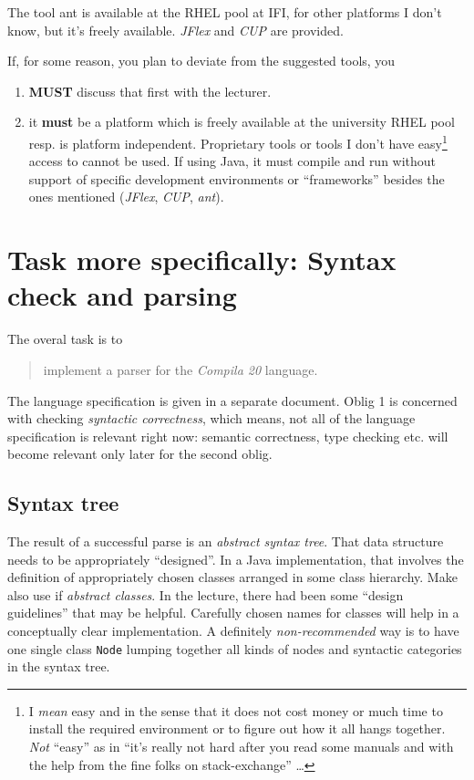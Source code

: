 \documentclass[10pt,freeform]{handout}[2014/08/13]
\begin{document}
The tool ant is available at the RHEL pool at IFI, for other platforms I
don't know, but it's freely available. \textsl{JFlex} and \textsl{CUP} are
provided.

If, for some reason, you plan to deviate from the suggested tools, you
\begin{enumerate}
\item \textbf{MUST} discuss that first with the lecturer.
\item it \textbf{must} be a platform which is freely available at the
  university RHEL pool resp. is platform independent. Proprietary tools or
  tools I don't have easy\footnote{I \emph{mean} easy and in the sense that
    it does not cost money or much time to install the required environment
    or to figure out how it all hangs together. \emph{Not} ``easy'' as in
    ``it's really not hard after you read some manuals and with the help
    from the fine folks on stack-exchange'' \ldots} access to cannot be
  used. If using Java, it must compile and run without support of specific
  development environments or ``frameworks'' besides the ones mentioned
  (\textsl{JFlex}, \textsl{CUP}, \textsl{ant}).
\end{enumerate}



\section{Task more specifically: Syntax check and parsing}
\label{sec:task-more-spec}


The overal task is to 

\begin{quote}
  implement a parser for the \textsl{Compila 20} language.
\end{quote}
The language specification is given in a separate document. Oblig 1 is
concerned with checking \emph{syntactic correctness}, which means, not all
of the language specification is relevant right now: semantic correctness,
type checking etc. will become relevant only later for the second oblig.


\subsection{Syntax tree}
\label{sec:syntax-tree}

The result of a successful parse is an \emph{abstract syntax tree}. That
data structure needs to be appropriately ``designed''. In a Java
implementation, that involves the definition of appropriately chosen
classes arranged in some class hierarchy. Make also use if \emph{abstract
  classes}. In the lecture, there had been some ``design guidelines'' that
may be helpful. Carefully chosen names for classes will help in a
conceptually clear implementation. A definitely \emph{non-recommended} way
is to have one single class \texttt{Node} lumping together all kinds of
nodes and syntactic categories in the syntax tree.
\end{document}
